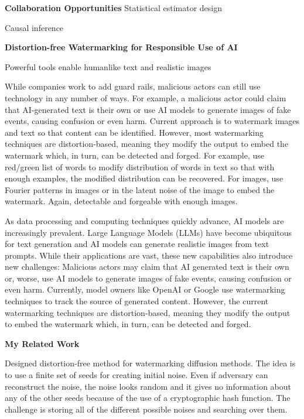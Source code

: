 \documentclass[11pt]{article}
\begin{document}
{{ \large \textbf{Collaboration Opportunities}}
Statistical estimator design

Causal inference

\begin{center}
{ \large \textbf{Distortion-free Watermarking for Responsible Use of AI}}
\end{center}

Powerful tools enable humanlike text and realistic images

While companies work to add guard rails, malicious actors can still use technology in any number of ways. For example, a malicious actor could claim that AI-generated text is their own or use AI models to generate images of fake events, causing confusion or even harm.
Current approach is to watermark images and text so that content can be identified.
However, most watermarking techniques are distortion-based, meaning they modify the output to embed the watermark which, in turn, can be detected and forged.
For example, use red/green list of words to modify distribution of words in text so that with enough examples, the modified distribution can be recovered.
For images, use Fourier patterns in images or in the latent noise of the image to embed the watermark.
Again, detectable and forgeable with enough images.

As data processing and computing techniques quickly advance, AI models are increasingly prevalent.
Large Language Models (LLMs) have become ubiquitous for text generation and AI models can generate realistic images from text prompts.
While their applications are vast, these new capabilities also introduce new challenges:
Malicious actors may claim that AI generated text is their own or, worse, use AI models to generate images of fake events, causing confusion or even harm.
Currently, model owners like OpenAI or Google use watermarking techniques to track the source of generated content.
However, the current watermarking techniques are distortion-based, meaning they modify the output to embed the watermark which, in turn, can be detected and forged.

{ \large \textbf{My Related Work}}

Designed distortion-free method for watermarking diffusion methods.
The idea is to use a finite set of seeds for creating initial noise.
Even if adversary can reconstruct the noise, the noise looks random and it gives no information about any of the other seeds because of the use of a cryptographic hash function.
The challenge is storing all of the different possible noises and searching over them.

}
\end{document}
